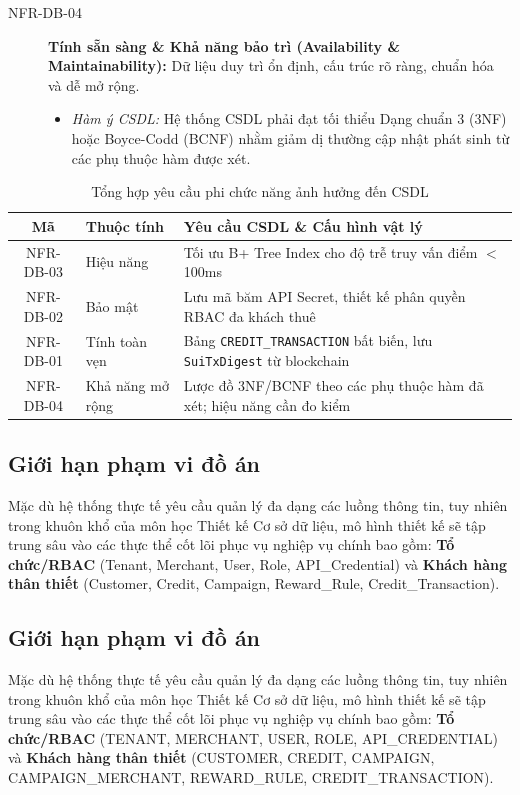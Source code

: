 \begin{description}
    \item[NFR-DB-04] \textbf{Tính sẵn sàng \& Khả năng bảo trì (Availability \& Maintainability):} Dữ liệu duy trì ổn định, cấu trúc rõ ràng, chuẩn hóa và dễ mở rộng.
    \begin{itemize}
        \item \textit{Hàm ý CSDL:} Hệ thống CSDL phải đạt tối thiểu Dạng chuẩn 3 (3NF) hoặc Boyce-Codd (BCNF) nhằm giảm dị thường cập nhật phát sinh từ các phụ thuộc hàm được xét.
    \end{itemize}
\end{description}

\begin{table}[H]
    \centering
    \caption{Tổng hợp yêu cầu phi chức năng ảnh hưởng đến CSDL}
    \label{tab:yeu_cau_pcn}
    \vspace{0.2cm}
    \renewcommand{\arraystretch}{1.3}
    \begin{tabular}{|c|l|>{\raggedright\arraybackslash}p{8.5cm}|}
        \hline
        \textbf{Mã} & \textbf{Thuộc tính} & \textbf{Yêu cầu CSDL \& Cấu hình vật lý} \\
        \hline
        NFR-DB-03 & Hiệu năng & Tối ưu B+ Tree Index cho độ trễ truy vấn điểm $<$ 100ms \\
        \hline
        NFR-DB-02 & Bảo mật & Lưu mã băm API Secret, thiết kế phân quyền RBAC đa khách thuê \\
        \hline
        NFR-DB-01 & Tính toàn vẹn & Bảng \texttt{CREDIT\_TRANSACTION} bất biến, lưu \texttt{SuiTxDigest} từ blockchain \\
        \hline
        NFR-DB-04 & Khả năng mở rộng & Lược đồ 3NF/BCNF theo các phụ thuộc hàm đã xét; hiệu năng cần đo kiểm \\
        \hline
    \end{tabular}
\end{table}
\subsection{Giới hạn phạm vi đồ án}
Mặc dù hệ thống thực tế yêu cầu quản lý đa dạng các luồng thông tin, tuy nhiên trong khuôn khổ của môn học Thiết kế Cơ sở dữ liệu, mô hình thiết kế sẽ tập trung sâu vào các thực thể cốt lõi phục vụ nghiệp vụ chính bao gồm: \textbf{Tổ chức/RBAC} (Tenant, Merchant, User, Role, API\_Credential) và \textbf{Khách hàng thân thiết} (Customer, Credit, Campaign, Reward\_Rule, Credit\_Transaction).

\subsection{Giới hạn phạm vi đồ án}
Mặc dù hệ thống thực tế yêu cầu quản lý đa dạng các luồng thông tin, tuy nhiên trong khuôn khổ của môn học Thiết kế Cơ sở dữ liệu, mô hình thiết kế sẽ tập trung sâu vào các thực thể cốt lõi phục vụ nghiệp vụ chính bao gồm: \textbf{Tổ chức/RBAC} (TENANT, MERCHANT, USER, ROLE, API\_CREDENTIAL) và \textbf{Khách hàng thân thiết} (CUSTOMER, CREDIT, CAMPAIGN, CAMPAIGN\_MERCHANT, REWARD\_RULE, CREDIT\_TRANSACTION).

